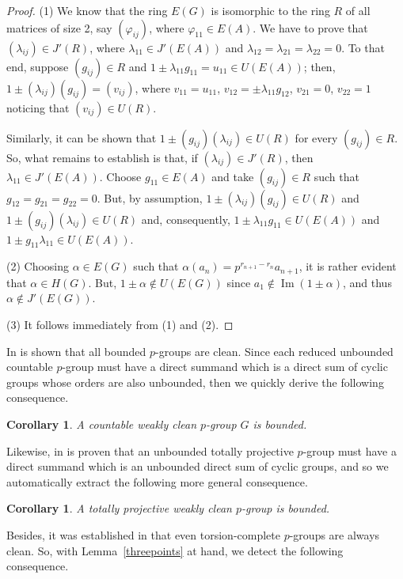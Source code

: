 \documentclass{amsart}
\DeclareMathOperator{\im}{Im}
\newtheorem{corollary}[theorem]{Corollary}
\theoremstyle{definition}
\theoremstyle{remark}
\numberwithin{equation}{section}
\begin{document}
\begin{proof} (1) We know that the ring $E(G)$ is isomorphic to the ring $R$ of all matrices of size 2, say
$(\varphi_{ij})$, where $\varphi_{11}\in E(A)$. We have to prove that $(\lambda_{ij})\in J'(R)$, where
$\lambda_{11}\in J'(E(A))$ and $\lambda_{12}=\lambda_{21}=\lambda_{22}=0$. To that end, suppose $(g_{ij})\in R$
and $1\pm \lambda_{11}g_{11}=u_{11}\in U(E(A))$; then, $1\pm (\lambda_{ij})(g_{ij})=(v_{ij})$, where
$v_{11}=u_{11}$, $v_{12}=\pm\lambda_{11}g_{12}$, $v_{21}=0$, $v_{22}=1$ noticing that $(v_{ij})\in U(R)$.

Similarly, it can be shown that $1\pm (g_{ij})(\lambda_{ij})\in U(R)$ for every $(g_{ij})\in R$. So, what remains to establish is that, if $(\lambda_{ij})\in J'(R)$, then $\lambda_{11}\in J'(E(A))$. Choose $g_{11}\in E(A)$ and take
$(g_{ij})\in R$ such that $g_{12}=g_{21}=g_{22}=0$. But, by assumption, $1\pm (\lambda_{ij})(g_{ij})\in U(R)$ and
$1\pm (g_{ij})(\lambda_{ij})\in U(R)$ and, consequently, $1\pm \lambda_{11}g_{11}\in U(E(A))$ and $1\pm g_{11}\lambda_{11}\in U(E(A))$.

(2) Choosing $\alpha\in E(G)$ such that $\alpha(a_n)=p^{r_{n+1}-r_n}a_{n+1}$, it is rather evident that $\alpha\in H(G)$. But, $1\pm \alpha\notin U(E(G))$ since $a_1\notin\im(1\pm\alpha)$, and thus $\alpha\notin J'(E(G))$.

(3) It follows immediately from (1) and (2).
\end{proof}

In \cite[Lemma 8]{GV} is shown that all bounded $p$-groups are clean. Since each reduced unbounded countable $p$-group must have a direct summand which is a direct sum of cyclic groups whose orders are also unbounded, then we quickly derive the following consequence.

\begin{corollary}
A countable weakly clean $p$-group $G$ is bounded.
\end{corollary}

Likewise, in \cite[Theorem 10]{GV} is proven that an unbounded totally projective $p$-group must have a direct summand which is an unbounded direct sum of cyclic groups, and so we automatically extract the following more general consequence.

\begin{corollary}
A totally projective weakly clean $p$-group is bounded.
\end{corollary}

Besides, it was established in \cite[Lemma 8]{GV} that even torsion-complete $p$-groups are always clean. So, with Lemma~\ref{threepoints} at hand, we detect the following consequence.
\end{document}
